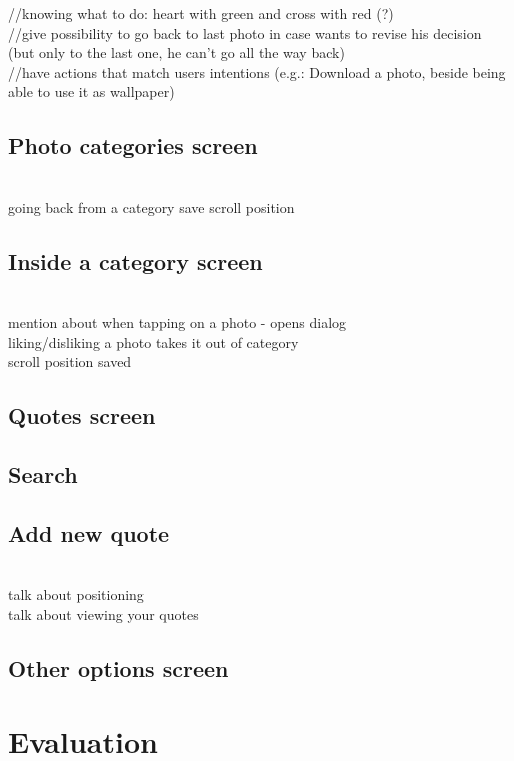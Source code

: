 \documentclass[version=last,fontsize=13pt]{scrartcl}
\begin{document}
//knowing what to do: heart with green and cross with red (?)\\

//give possibility to go back to last photo in case wants to revise his decision (but only to the last one, he can't go all the way back)\\

//have actions that match users intentions (e.g.: Download a photo, beside being able to use it as wallpaper)\\

\subsection{Photo categories screen}

	\\going back from a category save scroll position

\subsection{Inside a category screen}
 \\mention about when tapping on a photo - opens dialog
	\\ liking/disliking a photo takes it out of category
	\\scroll position saved

\subsection{Quotes screen}

\subsection{Search}

\subsection{Add new quote}
	\\talk about positioning
	\\talk about viewing your quotes

\subsection{Other options screen}
\section{Evaluation}
\end{document}
